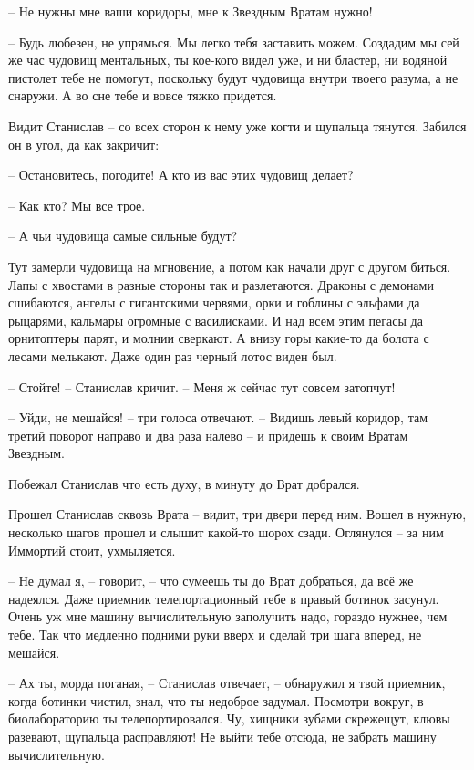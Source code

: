 \documentclass[ebook,oneside,final,openright]{memoir}
\begin{document}
– Не нужны мне ваши коридоры, мне к Звездным Вратам нужно!\par
– Будь любезен, не упрямься. Мы легко тебя заставить можем. Создадим мы сей же час чудовищ ментальных, ты кое-кого видел уже, и ни бластер, ни водяной пистолет тебе не помогут, поскольку будут чудовища внутри твоего разума, а не снаружи. А во сне тебе и вовсе тяжко придется.\par
\par
Видит Станислав – со всех сторон к нему уже когти и щупальца тянутся. Забился он в угол, да как закричит:\par
– Остановитесь, погодите! А кто из вас этих чудовищ делает?\par
– Как кто? Мы все трое.\par
– А чьи чудовища самые сильные будут?\par
Тут замерли чудовища на мгновение, а потом как начали друг с другом биться. Лапы с хвостами в разные стороны так и разлетаются. Драконы с демонами сшибаются, ангелы с гигантскими червями, орки и гоблины с эльфами да рыцарями, кальмары огромные с василисками. И над всем этим пегасы да орнитоптеры парят, и молнии сверкают. А внизу горы какие-то да болота с лесами мелькают. Даже один раз черный лотос виден был. \par
– Стойте! – Станислав кричит. – Меня ж сейчас тут совсем затопчут!\par
– Уйди, не мешайся! – три голоса отвечают. – Видишь левый коридор, там третий поворот направо и два раза налево – и придешь к своим Вратам Звездным.\par
\par
Побежал Станислав что есть духу, в минуту до Врат добрался.\par
\par
Прошел Станислав сквозь Врата – видит, три двери перед ним. Вошел в нужную, несколько шагов прошел и слышит какой-то шорох сзади. Оглянулся – за ним Иммортий стоит, ухмыляется. \par
\par
– Не думал я, – говорит, – что сумеешь ты до Врат добраться, да всё же надеялся. Даже приемник телепортационный тебе в правый ботинок засунул. Очень уж мне машину вычислительную заполучить надо, гораздо нужнее, чем тебе. Так что медленно подними руки вверх и сделай три шага вперед, не мешайся.\par
– Ах ты, морда поганая, – Станислав отвечает, – обнаружил я твой приемник, когда ботинки чистил, знал, что ты недоброе задумал. Посмотри вокруг, в биолабораторию ты телепортировался. Чу, хищники зубами скрежещут, клювы разевают, щупальца расправляют! Не выйти тебе отсюда, не забрать машину вычислительную.\par
\end{document}
